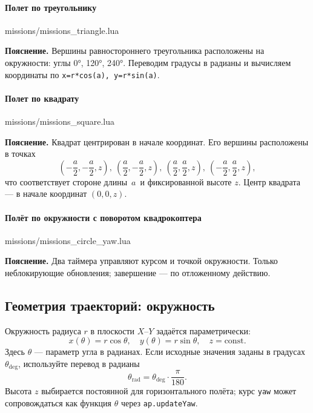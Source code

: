 \paragraph{Полет по треугольнику}
\begin{codefile}{missions/missions_triangle.lua}
\end{codefile}
\textbf{Пояснение.} Вершины равностороннего треугольника расположены на окружности: углы 0°, 120°, 240°. Переводим градусы в радианы и вычисляем координаты по \texttt{x=r*cos(a), y=r*sin(a)}.

\paragraph{Полет по квадрату}
\begin{codefile}{missions/missions_square.lua}
\end{codefile}
\textbf{Пояснение.} Квадрат центрирован в начале координат. Его вершины расположены в точках
\[
  \left(-\frac{a}{2}, -\frac{a}{2}, z\right),\ \left(\frac{a}{2}, -\frac{a}{2}, z\right),\ \left(\frac{a}{2}, \frac{a}{2}, z\right),\ \left(-\frac{a}{2}, \frac{a}{2}, z\right),
\]
что соответствует стороне длины \(\,a\,\) и фиксированной высоте \(z\). Центр квадрата — в начале координат \((0,0,z)\).

\paragraph{Полёт по окружности с поворотом квадрокоптера}
\begin{codefile}{missions/missions_circle_yaw.lua}
\end{codefile}
\textbf{Пояснение.} Два таймера управляют курсом и точкой окружности. Только неблокирующие обновления; завершение — по отложенному действию.

\subsection{Геометрия траекторий: окружность}
Окружность радиуса \(r\) в плоскости \(X\)–\(Y\) задаётся параметрически:
\[
  x(\theta) = r \cos\theta,\quad y(\theta) = r \sin\theta,\quad z = \text{const}.
\]
Здесь \(\theta\) — параметр угла в радианах. Если исходные значения заданы в градусах \(\theta_{\mathrm{deg}}\), используйте перевод в радианы
\[
  \theta_{\mathrm{rad}} = \theta_{\mathrm{deg}} \cdot \frac{\pi}{180}.
\]
Высота \(z\) выбирается постоянной для горизонтального полёта; курс \texttt{yaw} может сопровождаться как функция \(\theta\) через \texttt{ap.updateYaw}.

